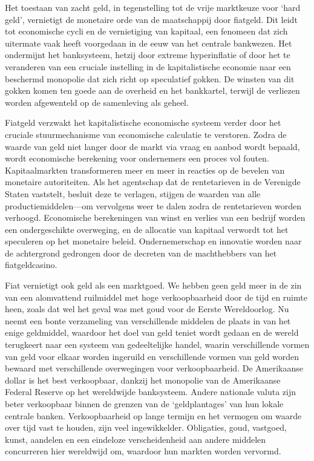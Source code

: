 \documentclass[
  a5paper,
  smalldemyvopaper,11pt,twoside,onecolumn,openright,extrafontsizes,
hidelinks]{memoir}
\begin{document}
Het toestaan van zacht geld, in tegenstelling tot de vrije marktkeuze
voor `hard geld', vernietigt de monetaire orde van de maatschappij door
fiatgeld. Dit leidt tot economische cycli en de vernietiging van
kapitaal, een fenomeen dat zich uitermate vaak heeft voorgedaan in de
eeuw van het centrale bankwezen. Het ondermijnt het banksysteem, hetzij
door extreme hyperinflatie of door het te veranderen van een cruciale
instelling in de kapitalistische economie naar een beschermd monopolie
dat zich richt op speculatief gokken. De winsten van dit gokken komen
ten goede aan de overheid en het bankkartel, terwijl de verliezen worden
afgewenteld op de samenleving als geheel.

Fiatgeld verzwakt het kapitalistische economische systeem verder door
het cruciale stuurmechanisme van economische calculatie te verstoren.
Zodra de waarde van geld niet langer door de markt via vraag en aanbod
wordt bepaald, wordt economische berekening voor ondernemers een proces
vol fouten. Kapitaalmarkten transformeren meer en meer in reacties op de
bevelen van monetaire autoriteiten. Als het agentschap dat de
rentetarieven in de Verenigde Staten vaststelt, besluit deze te
verlagen, stijgen de waarden van alle productiemiddelen---om vervolgens
weer te dalen zodra de rentetarieven worden verhoogd. Economische
berekeningen van winst en verlies van een bedrijf worden een
ondergeschikte overweging, en de allocatie van kapitaal verwordt tot het
speculeren op het monetaire beleid. Ondernemerschap en innovatie worden
naar de achtergrond gedrongen door de decreten van de machthebbers van
het fiatgeldcasino.

Fiat vernietigt ook geld als een marktgoed. We hebben geen geld meer in
de zin van een alomvattend ruilmiddel met hoge verkoopbaarheid door de
tijd en ruimte heen, zoals dat wel het geval was met goud voor de Eerste
Wereldoorlog. Nu neemt een bonte verzameling van verschillende middelen
de plaats in van het enige geldmiddel, waardoor het doel van geld teniet
wordt gedaan en de wereld terugkeert naar een systeem van gedeeltelijke
handel, waarin verschillende vormen van geld voor elkaar worden
ingeruild en verschillende vormen van geld worden bewaard met
verschillende overwegingen voor verkoopbaarheid. De Amerikaanse dollar
is het best verkoopbaar, dankzij het monopolie van de Amerikaanse
Federal Reserve op het wereldwijde banksysteem. Andere nationale valuta
zijn beter verkoopbaar binnen de grenzen van de `geldplantages' van hun
lokale centrale banken. Verkoopbaarheid op lange termijn en het vermogen
om waarde over tijd vast te houden, zijn veel ingewikkelder. Obligaties,
goud, vastgoed, kunst, aandelen en een eindeloze verscheidenheid aan
andere middelen concurreren hier wereldwijd om, waardoor hun markten
worden vervormd.
\end{document}
